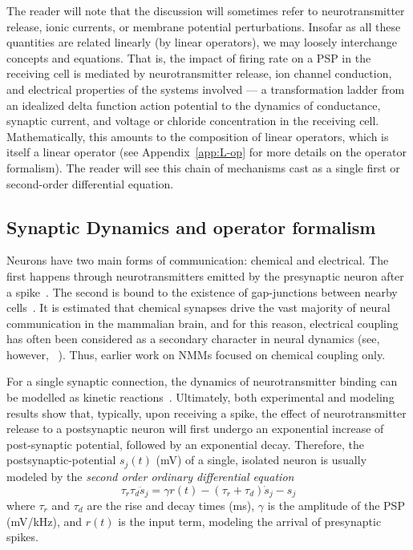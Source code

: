 \documentclass[12pt]{article}
\numberwithin{equation}{section}
\begin{document}
\begin{tcolorbox}[colback=gray!6,colframe=gray!6,enlarge left by=0mm,
  boxrule=0pt, enhanced, sharp corners]
The reader will note that the discussion will sometimes refer to neurotransmitter release, ionic currents, or membrane potential perturbations. Insofar as all these quantities are related linearly (by linear operators), we may loosely interchange concepts and equations.
That is, the impact of firing rate on a PSP in the receiving cell is mediated by neurotransmitter release, ion channel conduction, and electrical properties of the systems involved ---
a transformation ladder from an idealized delta function
action potential to the dynamics of conductance, synaptic current, and voltage
or chloride concentration in the receiving cell. Mathematically, this amounts to the composition of linear operators, which is itself a linear operator (see Appendix~\ref{app:L-op} for more details on the operator formalism). 
The reader will see this chain of mechanisms cast as a single first or second-order differential equation. 
\end{tcolorbox}

\subsection{Synaptic Dynamics and operator formalism}\label{sec:synaptic-dynamics}
Neurons have two main forms of communication: chemical and electrical.
The first happens through neurotransmitters emitted by the presynaptic
neuron after a spike~\cite{hillis2020}.
The second is bound to the existence of gap-junctions between nearby cells~\cite{goodenough2009}.
It is estimated that chemical synapses drive the vast majority of
neural communication in the mammalian brain, and for this reason, electrical
coupling has often been considered as a secondary character in neural dynamics (see, however, ~\cite{pereda2014,alcami2019,vaughn2022}).
Thus, earlier work on NMMs focused on chemical coupling only. %

For a single synaptic connection, the dynamics of neurotransmitter binding
can be modelled as kinetic reactions~\cite{destexhe1994,Destexhe1998,dayan2001}.
Ultimately, both experimental and modeling results show that, typically, upon receiving a spike, the effect of neurotransmitter release to a postsynaptic neuron will first undergo an exponential increase of post-synaptic potential, followed by an exponential decay. 
Therefore, the postsynaptic-potential $s_j(t)$ (mV) of a single, isolated neuron
is usually modeled by the \textit{second order ordinary differential equation}~\cite{dayan2001,gerstner2014}
\begin{equation}\label{eq:synapses_single}
    \tau_r\tau_d\ddot s_j = \gamma r(t) - (\tau_r+\tau_d) \dot s_j -s_j
\end{equation}
where $\tau_r$ and $\tau_d$ are the rise and decay times (ms), $\gamma$ is the amplitude of the PSP (mV/kHz), and $r(t)$ is the input term, modeling the arrival of presynaptic spikes.
 
\end{document}
